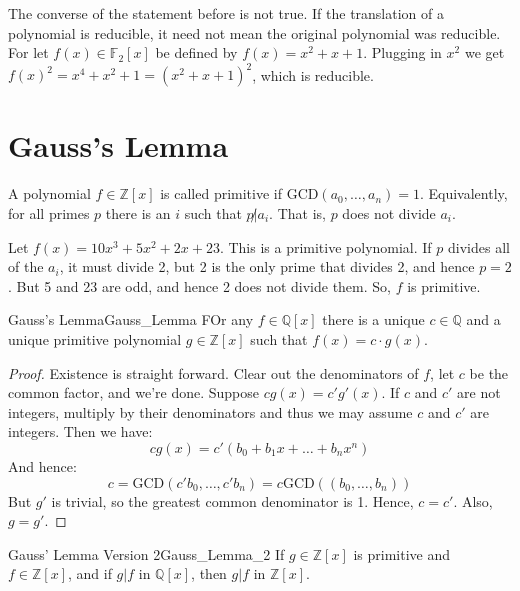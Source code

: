         The converse of the statement before is not true. If the translation
        of a polynomial is reducible, it need not mean the original
        polynomial was reducible. For let $f(x)\in\mathbb{F}_{2}[x]$ be
        defined by $f(x)=x^{2}+x+1$. Plugging in $x^{2}$ we get
        $f(x)^{2}=x^{4}+x^{2}+1=(x^{2}+x+1)^{2}$, which is reducible.
\section{Gauss's Lemma}
    \begin{definition}
        A polynomial $f\in\mathbb{Z}[x]$ is called primitive if
        $\textrm{GCD}(a_{0},\dots,a_{n})=1$. Equivalently, for all primes
        $p$ there is an $i$ such that $p\not|a_{i}$. That is, $p$ does not
        divide $a_{i}$.
    \end{definition}
    \begin{example}
        Let $f(x)=10x^{3}+5x^{2}+2x+23$. This is a primitive polynomial.
        If $p$ divides all of the $a_{i}$, it must divide 2, but 2 is the
        only prime that divides 2, and hence $p=2$. But 5 and 23 are odd,
        and hence 2 does not divide them. So, $f$ is primitive.
    \end{example}
    \begin{ltheorem}{Gauss's Lemma}{Gauss_Lemma}
        FOr any $f\in\mathbb{Q}[x]$ there is a unique $c\in\mathbb{Q}$ and
        a unique primitive polynomial $g\in\mathbb{Z}[x]$ such that
        $f(x)=c\cdot{g}(x)$.
    \end{ltheorem}
    \begin{proof}
        Existence is straight forward. Clear out the denominators of $f$,
        let $c$ be the common factor, and we're done. Suppose
        $cg(x)=c'g'(x)$. If $c$ and $c'$ are not integers, multiply by their
        denominators and thus we may assume $c$ and $c'$ are integers. Then
        we have:
        \begin{equation}
            cg(x)=c'(b_{0}+b_{1}x+\dots+b_{n}x^{n})
        \end{equation}
        And hence:
        \begin{equation}
            c=\textrm{GCD}(c'b_{0},\dots,c'b_{n})
             =c\textrm{GCD}((b_{0},\dots,b_{n}))
        \end{equation}
        But $g'$ is trivial, so the greatest common denominator is 1. Hence,
        $c=c'$. Also, $g=g'$.
    \end{proof}
    \begin{ltheorem}{Gauss' Lemma Version 2}{Gauss_Lemma_2}
        If $g\in\mathbb{Z}[x]$ is primitive and $f\in\mathbb{Z}[x]$, and if
        $g|f$ in $\mathbb{Q}[x]$, then $g|f$ in $\mathbb{Z}[x]$.
    \end{ltheorem}
